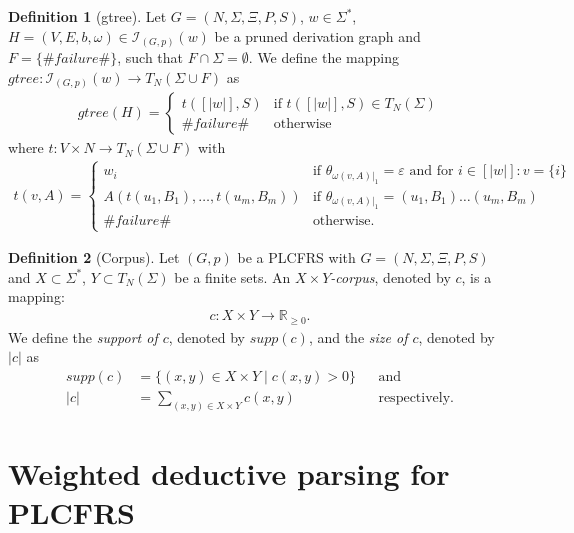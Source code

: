 \documentclass{tudscrartcl}
\theoremstyle{definition}
\newtheorem{definition}{Definition}[section]
\begin{document}
\begin{definition}[gtree]
	Let $G = (N, \Sigma, \Xi, P ,S)$, $w \in \Sigma^*$,
	$H = (V, E, b, \omega) \in \mathcal{I}_{(G, p)}(w)$ be a pruned derivation graph
	and $F = \{\#failure\#\}$, such that $F \cap \Sigma = \emptyset$.
	We define the mapping $gtree: \mathcal{I}_{(G, p)}(w) \to T_N(\Sigma \cup F)$ as
	\begin{align*}
		gtree(H) =
		\begin{cases}
			t([|w|], S)
			&\text{if } t([|w|], S) \in T_N(\Sigma)\\
			\#failure\#
			&\text{otherwise}
		\end{cases}
	\end{align*}
	where $t: V \times N \to T_N(\Sigma \cup F)$ with
	\begin{align*}
		t(v, A) =
		\begin{cases}
			w_i
			& \text{if } \theta_{\omega(v, A)|_1} = \varepsilon
			\text{ and for } i \in [|w|]: v = \{i\}\\
			A(t(u_1, B_1), \ldots, t(u_m, B_m))
			& \text{if } \theta_{\omega(v, A)|_1} = (u_1, B_1) \ldots (u_m, B_m)\\
			\#failure\#
			& \text{otherwise.}
		\end{cases}
	\end{align*}
\end{definition}

\begin{definition}[Corpus]
	Let $(G, p)$ be a PLCFRS with $G = (N, \Sigma, \Xi, P, S)$
	and $X \subset \Sigma^*$, $Y \subset T_N(\Sigma)$ be a finite sets.
	An \emph{$X\times Y$-corpus}, denoted by $c$, is a mapping:
	\begin{align*}
		c: X \times Y \to \mathbb{R}_{\geq 0}.
	\end{align*}
	We define the \emph{support of $c$}, denoted by $supp(c)$, and the
	\emph{size of $c$}, denoted by $|c|$ as
	\begin{align*}
		supp(c) &= \{(x, y) \in X \times Y \mid c(x, y) > 0\}
		&& \text{and} \\
		|c| &= \sum_{(x, y) \in X \times Y}c(x, y)
		&& \text{respectively.}
	\end{align*}
\end{definition}


\section{Weighted deductive parsing for PLCFRS}
\end{document}
